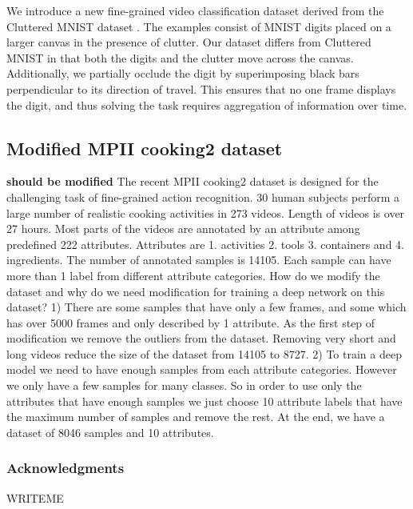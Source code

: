 \documentclass{article} %
\begin{document}
We introduce a new fine-grained video classification dataset derived from the Cluttered MNIST dataset \cite{clutteredmnist}.
The examples consist of MNIST digits placed on a larger canvas in the presence of clutter.
Our dataset differs from Cluttered MNIST in that both the digits and the clutter move across the canvas.
Additionally, we partially occlude the digit by superimposing black bars perpendicular to its direction of travel.
This ensures that no one frame displays the digit, and thus solving the task requires aggregation of information over time.

\subsection{Modified MPII cooking2 dataset}
\textbf{should be modified} The recent MPII cooking2 dataset is designed for the challenging task of fine-grained action recognition. 30 human subjects perform a large number of realistic cooking activities in 273 videos. Length of videos is over 27 hours. Most parts of the videos are annotated by an attribute among predefined 222 attributes. Attributes are 1. activities 2. tools 3. containers and 4. ingredients. The number of annotated samples is 14105. Each sample can have more than 1 label from different attribute categories. 
How do we modify the dataset and why do we need modification for training a deep network on this dataset? 
1) There are some samples that have only a few frames, and some which has over 5000 frames and only described by 1 attribute. As the first step of modification we remove the outliers from the dataset. Removing very short and long videos reduce the size of the dataset from 14105 to 8727.
2) To train a deep model we need to have enough samples from each attribute categories. However we only have a few samples for many classes. So in order to use only the attributes that have enough samples we just choose 10 attribute labels that have the maximum number of samples and remove the rest. At the end, we have a dataset of 8046 samples and 10 attributes.
\subsubsection*{Acknowledgments}

WRITEME



\end{document}
